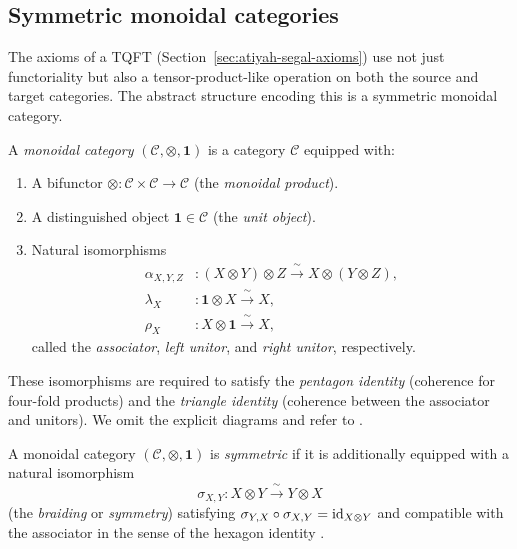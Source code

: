 \subsection{Symmetric monoidal categories}\label{appsec:monoidal}

The axioms of a TQFT (Section~\ref{sec:atiyah-segal-axioms}) use not just functoriality but also a tensor-product-like operation on both the source and target categories.  The abstract structure encoding this is a symmetric monoidal category.

\begin{definition}\label{def:monoidal-category}
A \emph{monoidal category} $(\mathcal{C}, \otimes, \mathbf{1})$ is a category $\mathcal{C}$ equipped with:
\begin{enumerate}
\item A bifunctor $\otimes : \mathcal{C} \times \mathcal{C} \to \mathcal{C}$ (the \emph{monoidal product}).
\item A distinguished object $\mathbf{1} \in \mathcal{C}$ (the \emph{unit object}).
\item Natural isomorphisms
\begin{align}
\alpha_{X,Y,Z} &: (X \otimes Y) \otimes Z \xrightarrow{\;\sim\;} X \otimes (Y \otimes Z), \label{eq:associator} \\
\lambda_X &: \mathbf{1} \otimes X \xrightarrow{\;\sim\;} X, \label{eq:left-unitor} \\
\rho_X &: X \otimes \mathbf{1} \xrightarrow{\;\sim\;} X, \label{eq:right-unitor}
\end{align}
called the \emph{associator}, \emph{left unitor}, and \emph{right unitor}, respectively.
\end{enumerate}
These isomorphisms are required to satisfy the \emph{pentagon identity} (coherence for four-fold products) and the \emph{triangle identity} (coherence between the associator and unitors).  We omit the explicit diagrams and refer to \cite[\S VII.1]{MacLane1998}.
\end{definition}

\begin{definition}\label{def:symmetric-monoidal}
A monoidal category $(\mathcal{C}, \otimes, \mathbf{1})$ is \emph{symmetric} if it is additionally equipped with a natural isomorphism
\begin{equation}\label{eq:braiding}
\sigma_{X,Y} : X \otimes Y \xrightarrow{\;\sim\;} Y \otimes X
\end{equation}
(the \emph{braiding} or \emph{symmetry}) satisfying $\sigma_{Y,X} \circ \sigma_{X,Y} = \operatorname{id}_{X \otimes Y}$ and compatible with the associator in the sense of the hexagon identity \cite[\S XI.1]{MacLane1998}.
\end{definition}

